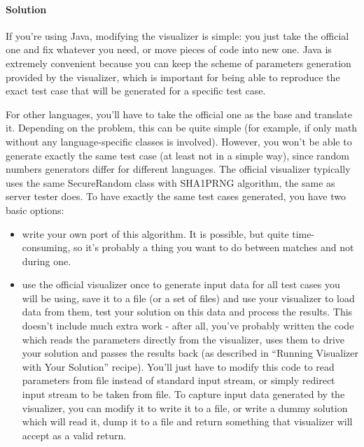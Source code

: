 \hypertarget{solution-2}{%
\paragraph{Solution}\label{solution-2}}

If you're using Java, modifying the visualizer is simple: you just take
the official one and fix whatever you need, or move pieces of code into
new one. Java is extremely convenient because you can keep the scheme of
parameters generation provided by the visualizer, which is important for
being able to reproduce the exact test case that will be generated for a
specific test case.

For other languages, you'll have to take the official one as the base
and translate it. Depending on the problem, this can be quite simple
(for example, if only math without any language-specific classes is
involved). However, you won't be able to generate exactly the same test
case (at least not in a simple way), since random numbers generators
differ for different languages. The official visualizer typically uses
the same SecureRandom class with SHA1PRNG algorithm, the same as server
tester does. To have exactly the same test cases generated, you have two
basic options:

\begin{itemize}
\item
  write your own port of this algorithm. It is possible, but quite
  time-consuming, so it's probably a thing you want to do between
  matches and not during one.
\item
  use the official visualizer once to generate input data for all test
  cases you will be using, save it to a file (or a set of files) and use
  your visualizer to load data from them, test your solution on this
  data and process the results. This doesn't include much extra work -
  after all, you've probably written the code which reads the parameters
  directly from the visualizer, uses them to drive your solution and
  passes the results back (as described in ``Running Visualizer with
  Your Solution'' recipe). You'll just have to modify this code to read
  parameters from file instead of standard input stream, or simply
  redirect input stream to be taken from file. To capture input data
  generated by the visualizer, you can modify it to write it to a file,
  or write a dummy solution which will read it, dump it to a file and
  return something that visualizer will accept as a valid return.
\end{itemize}

